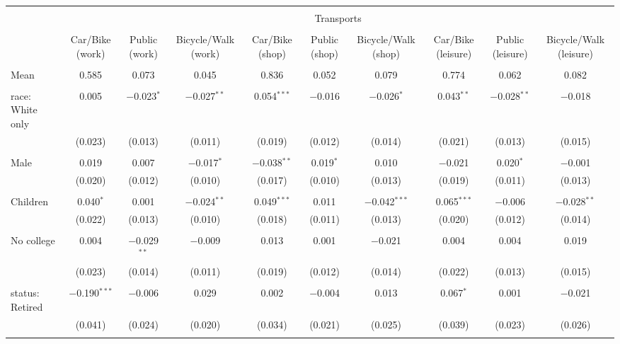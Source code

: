 
\begin{tabular}{@{\extracolsep{5pt}}lccccccccc} 
\\[-1.8ex]\hline 
\hline \\[-1.8ex] 
 & \multicolumn{9}{c}{Transports} \\ 
\cline{2-10} 
\\[-1.8ex] & Car/Bike (work) & Public (work) & Bicycle/Walk (work) & Car/Bike (shop) & Public (shop) & Bicycle/Walk (shop) & Car/Bike (leisure) & Public (leisure) & Bicycle/Walk (leisure) \\ 
\hline \\[-1.8ex] 
 Mean & 0.585 & 0.073 & 0.045 & 0.836 & 0.052 & 0.079 & 0.774 & 0.062 & 0.082  \\ \hline \\[-1.8ex] race: White only & 0.005 & $-$0.023$^{*}$ & $-$0.027$^{**}$ & 0.054$^{***}$ & $-$0.016 & $-$0.026$^{*}$ & 0.043$^{**}$ & $-$0.028$^{**}$ & $-$0.018 \\ 
  & (0.023) & (0.013) & (0.011) & (0.019) & (0.012) & (0.014) & (0.021) & (0.013) & (0.015) \\ 
  & & & & & & & & & \\ 
 Male & 0.019 & 0.007 & $-$0.017$^{*}$ & $-$0.038$^{**}$ & 0.019$^{*}$ & 0.010 & $-$0.021 & 0.020$^{*}$ & $-$0.001 \\ 
  & (0.020) & (0.012) & (0.010) & (0.017) & (0.010) & (0.013) & (0.019) & (0.011) & (0.013) \\ 
  & & & & & & & & & \\ 
 Children & 0.040$^{*}$ & 0.001 & $-$0.024$^{**}$ & 0.049$^{***}$ & 0.011 & $-$0.042$^{***}$ & 0.065$^{***}$ & $-$0.006 & $-$0.028$^{**}$ \\ 
  & (0.022) & (0.013) & (0.010) & (0.018) & (0.011) & (0.013) & (0.020) & (0.012) & (0.014) \\ 
  & & & & & & & & & \\ 
 No college & 0.004 & $-$0.029$^{**}$ & $-$0.009 & 0.013 & 0.001 & $-$0.021 & 0.004 & 0.004 & 0.019 \\ 
  & (0.023) & (0.014) & (0.011) & (0.019) & (0.012) & (0.014) & (0.022) & (0.013) & (0.015) \\ 
  & & & & & & & & & \\ 
 status: Retired & $-$0.190$^{***}$ & $-$0.006 & 0.029 & 0.002 & $-$0.004 & 0.013 & 0.067$^{*}$ & 0.001 & $-$0.021 \\ 
  & (0.041) & (0.024) & (0.020) & (0.034) & (0.021) & (0.025) & (0.039) & (0.023) & (0.026) \\ 
  & & & & & & & & & \\ 

\end{tabular}
